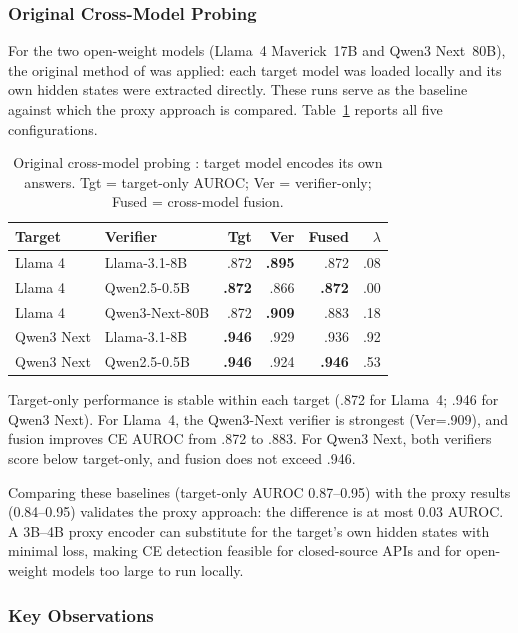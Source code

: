 \documentclass[12pt,twocolumn]{article}
\begin{document}
\subsubsection{Original Cross-Model Probing \citep{tan2025consistent}}

For the two open-weight models (Llama~4 Maverick~17B and Qwen3
Next~80B), the original method of \citet{tan2025consistent} was
applied: each target model was loaded locally and its own hidden
states were extracted directly. These runs serve as the baseline
against which the proxy approach is compared.
Table~\ref{tab:wb_baseline} reports all five configurations.

\begin{table}[H]
\centering
\scriptsize
\begin{tabular}{llrrrr}
\toprule
Target & Verifier & Tgt & Ver & Fused & $\lambda$ \\
\midrule
Llama 4 & Llama-3.1-8B     & .872 & \textbf{.895} & .872 & .08 \\
Llama 4 & Qwen2.5-0.5B     & \textbf{.872} & .866 & \textbf{.872} & .00 \\
Llama 4 & Qwen3-Next-80B   & .872 & \textbf{.909} & .883 & .18 \\
\midrule
Qwen3 Next & Llama-3.1-8B  & \textbf{.946} & .929 & .936 & .92 \\
Qwen3 Next & Qwen2.5-0.5B  & \textbf{.946} & .924 & \textbf{.946} & .53 \\
\bottomrule
\end{tabular}
\caption{Original cross-model probing \citep{tan2025consistent}: target
model encodes its own answers. Tgt = target-only AUROC; Ver =
verifier-only; Fused = cross-model fusion.}
\label{tab:wb_baseline}
\end{table}

Target-only performance is stable within each target (.872 for
Llama~4; .946 for Qwen3 Next). For Llama~4, the Qwen3-Next
verifier is strongest (Ver=.909), and fusion improves CE AUROC from
.872 to .883. For Qwen3 Next, both verifiers score below
target-only, and fusion does not exceed .946.

Comparing these baselines (target-only AUROC 0.87--0.95) with the
proxy results (0.84--0.95) validates the proxy approach: the
difference is at most 0.03 AUROC. A 3B--4B proxy encoder can
substitute for the target's own hidden states with minimal loss,
making CE detection feasible for closed-source APIs and for
open-weight models too large to run locally.

\subsubsection{Key Observations}
\end{document}
